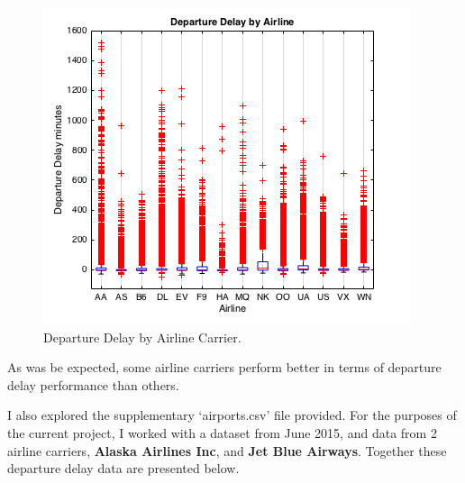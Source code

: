 \documentclass[a4paper, 10pt]{article}
\begin{document}
\begin{figure}[H]
\begin{center}
\includegraphics[scale=0.5]{departureDelayByAirline}
\caption{Departure Delay by Airline Carrier.}
\label{departureDelayByAirline}
\end{center}
\end{figure}

As was be expected, some airline carriers perform better in terms of departure delay performance than others.

\vspace{5mm}
I also explored the supplementary `airports.csv' file provided. For the purposes of the current project, I worked with a dataset from June 2015, and data from 2 airline carriers, \textbf{Alaska Airlines Inc}, and \textbf{Jet Blue Airways}. Together these departure delay data are presented below.
\end{document}
